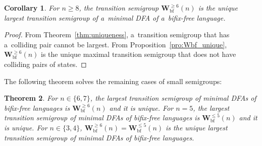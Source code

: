\documentclass{amsart}
\newtheorem{theorem}{Theorem}
\newtheorem{corollary}[theorem]{Corollary}
\renewcommand{\le}{\leqslant}
\renewcommand{\ge}{\geqslant}
\newcommand{\Vbf}{\mathbf{W}^{\le 5}_{\mathrm{bf}}}
\newcommand{\Wbf}{\mathbf{W}^{\ge 6}_{\mathrm{bf}}}
\begin{document}
\begin{corollary}
For $n \ge 8$, the transition semigroup $\Wbf(n)$ is the unique largest transition semigroup of a~minimal DFA of a~bifix-free language.
\end{corollary}
\begin{proof}
From Theorem~\ref{thm:uniqueness}, a~transition semigroup that has a~colliding pair cannot be largest.
From Proposition~\ref{pro:Wbf_unique}, $\Wbf(n)$ is the unique maximal transition semigroup that does not have colliding pairs of states.
\end{proof}

The following theorem solves the remaining cases of small semigroups:
\begin{theorem}
For $n \in \{6,7\}$, the largest transition semigroup of minimal DFAs of bifix-free languages is $\Wbf(n)$ and it is unique.
For $n = 5$, the largest transition semigroup of minimal DFAs of bifix-free languages is $\Vbf(n)$ and it is unique.
For $n \in \{3,4\}$, $\Wbf(n)=\Vbf(n)$ is the unique largest transition semigroup of minimal DFAs of bifix-free languages.
\end{theorem}
\end{document}
